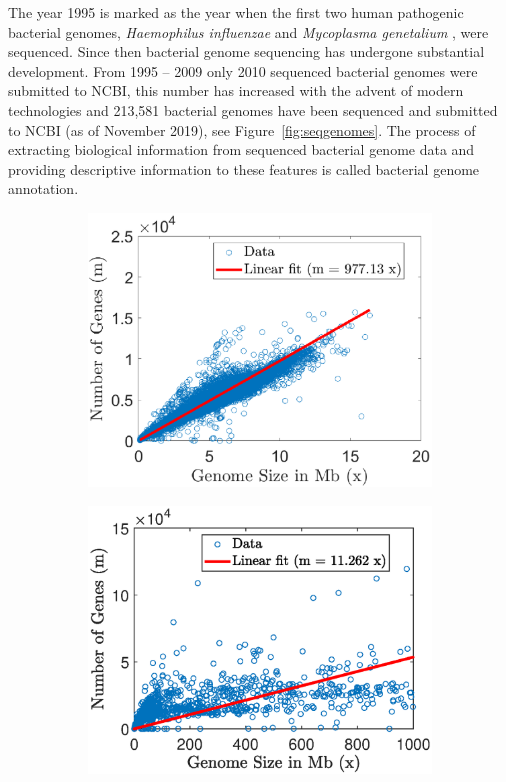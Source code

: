 The year 1995 is marked as the year when the first two human pathogenic bacterial genomes, \textit{Haemophilus influenzae} \citep{fleischmann_whole-genome_1995} and \textit{Mycoplasma genetalium} \citep{fraser_minimal_1995}, were sequenced. Since then bacterial genome sequencing has undergone substantial development. From 1995 – 2009 only 2010 sequenced bacterial genomes were submitted to NCBI, this number has increased with the advent of modern technologies  and 213,581 bacterial genomes have been sequenced and submitted to NCBI (as of November 2019), see Figure~\ref{fig:seqgenomes}.  
  The process of extracting biological information from sequenced bacterial genome data and providing descriptive information to these features is called bacterial genome annotation.
   \begin{figure}[t]
    \centering
     \begin{subfigure}[t]{0.45\textwidth} 
    \includegraphics[scale=0.55]{bac}
     \end{subfigure}\hfill
         \begin{subfigure}[t]{0.45\textwidth}
          \includegraphics[scale=0.55]{eu}

\end{subfigure}
\end{figure}
